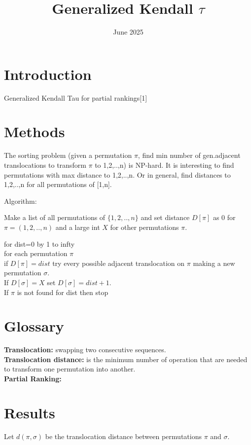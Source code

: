 \documentclass{article}
\title{Generalized Kendall $\tau$}
\author{ }
\date{June 2025}
\begin{document}
\maketitle

\section*{Introduction}
Generalized Kendall Tau for partial rankings[1]

\section*{Methods}

The sorting problem (given a permutation $\pi$, find min number of gen.adjacent translocations to transform $\pi$ to 1,2,..,n) is NP-hard. 
It is interesting to find permutations with max distance to 1,2,..,n.
Or in general, find distances to 1,2,..,n for all permutations of [1,n]. 

Algorithm:

Make a list of all permutations of $\{1,2,..,n\}$ and set distance $D[\pi]$ as 0 for $\pi=(1,2,..,n)$ and a large int $X$ for other permutations $\pi$.

for dist=0 by 1 to infty\\
for each permutation $\pi$\\
if $D[\pi]=dist$ try every possible adjacent translocation on $\pi$ making a new permutation $\sigma$.\\
If $D[\sigma]=X$ set $D[\sigma]=dist+1$.\\
If $\pi$ is not found for dist then stop

\section*{Glossary}
\textbf{Translocation:} swapping two consecutive sequences. \\
\textbf{Translocation distance:} is the minimum number of operation that are needed to transform one permutation into another. \\
\textbf{Partial Ranking:} 

\vspace{0.5cm}

\section{Results}

Let $d(\pi,\sigma)$ be the translocation distance between permutations $\pi $ and $\sigma $.
\end{document}
